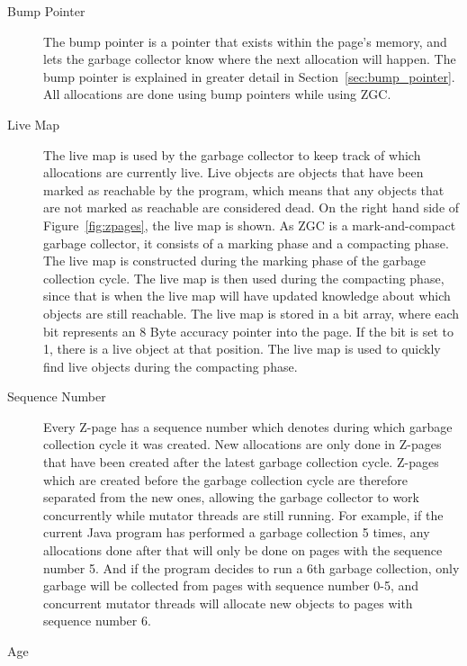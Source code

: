\begin{description}
    \item[Bump Pointer]
        The bump pointer is a pointer that exists within the page's memory, and lets the garbage collector know where the next allocation will happen. The bump pointer is explained in greater detail in Section~\ref{sec:bump_pointer}. All allocations are done using bump pointers while using ZGC.
    \item[Live Map]
        The live map is used by the garbage collector to keep track of which allocations are currently live. Live objects are objects that have been marked as reachable by the program, which means that any objects that are not marked as reachable are considered dead. On the right hand side of Figure~\ref*{fig:zpages}, the live map is shown. As ZGC is a mark-and-compact garbage collector, it consists of a marking phase and a compacting phase. The live map is constructed during the marking phase of the garbage collection cycle. The live map is then used during the compacting phase, since that is when the live map will have updated knowledge about which objects are still reachable. The live map is stored in a bit array, where each bit represents an 8 Byte accuracy pointer into the page. If the bit is set to 1, there is a live object at that position. The live map is used to quickly find live objects during the compacting phase.
    \item[Sequence Number]
        Every Z-page has a sequence number which denotes during which garbage collection cycle it was created. New allocations are only done in Z-pages that have been created after the latest garbage collection cycle. Z-pages which are created before the garbage collection cycle are therefore separated from the new ones, allowing the garbage collector to work concurrently while mutator threads are still running. For example, if the current Java program has performed a garbage collection 5 times, any allocations done after that will only be done on pages with the sequence number 5. And if the program decides to run a 6th garbage collection, only garbage will be collected from pages with sequence number 0-5, and concurrent mutator threads will allocate new objects to pages with sequence number 6.
    \item[Age]

\end{description}
